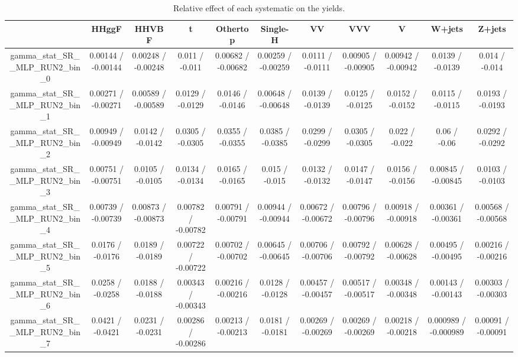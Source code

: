 \documentclass[10pt]{article}
\begin{document}
\begin{table}[htbp]
\begin{center}
\begin{tabular}{|c|c|c|c|c|c|c|c|c|c|c|}
\hline 
      & HHggF      & HHVBF      & t      & Othertop      & Single-H      & VV      & VVV      & V      & W+jets      & Z+jets \\ 
\hline 
  gamma_stat_SR__MLP_RUN2_bin_0 & 0.00144 / -0.00144 & 0.00248 / -0.00248 & 0.011 / -0.011 & 0.00682 / -0.00682 & 0.00259 / -0.00259 & 0.0111 / -0.0111 & 0.00905 / -0.00905 & 0.00942 / -0.00942 & 0.0139 / -0.0139 & 0.014 / -0.014 \\ 
  gamma_stat_SR__MLP_RUN2_bin_1 & 0.00271 / -0.00271 & 0.00589 / -0.00589 & 0.0129 / -0.0129 & 0.0146 / -0.0146 & 0.00648 / -0.00648 & 0.0139 / -0.0139 & 0.0125 / -0.0125 & 0.0152 / -0.0152 & 0.0115 / -0.0115 & 0.0193 / -0.0193 \\ 
  gamma_stat_SR__MLP_RUN2_bin_2 & 0.00949 / -0.00949 & 0.0142 / -0.0142 & 0.0305 / -0.0305 & 0.0355 / -0.0355 & 0.0385 / -0.0385 & 0.0299 / -0.0299 & 0.0305 / -0.0305 & 0.022 / -0.022 & 0.06 / -0.06 & 0.0292 / -0.0292 \\ 
  gamma_stat_SR__MLP_RUN2_bin_3 & 0.00751 / -0.00751 & 0.0105 / -0.0105 & 0.0134 / -0.0134 & 0.0165 / -0.0165 & 0.015 / -0.015 & 0.0132 / -0.0132 & 0.0147 / -0.0147 & 0.0156 / -0.0156 & 0.00845 / -0.00845 & 0.0103 / -0.0103 \\ 
  gamma_stat_SR__MLP_RUN2_bin_4 & 0.00739 / -0.00739 & 0.00873 / -0.00873 & 0.00782 / -0.00782 & 0.00791 / -0.00791 & 0.00944 / -0.00944 & 0.00672 / -0.00672 & 0.00796 / -0.00796 & 0.00918 / -0.00918 & 0.00361 / -0.00361 & 0.00568 / -0.00568 \\ 
  gamma_stat_SR__MLP_RUN2_bin_5 & 0.0176 / -0.0176 & 0.0189 / -0.0189 & 0.00722 / -0.00722 & 0.00702 / -0.00702 & 0.00645 / -0.00645 & 0.00706 / -0.00706 & 0.00792 / -0.00792 & 0.00628 / -0.00628 & 0.00495 / -0.00495 & 0.00216 / -0.00216 \\ 
  gamma_stat_SR__MLP_RUN2_bin_6 & 0.0258 / -0.0258 & 0.0188 / -0.0188 & 0.00343 / -0.00343 & 0.00216 / -0.00216 & 0.0128 / -0.0128 & 0.00457 / -0.00457 & 0.00517 / -0.00517 & 0.00348 / -0.00348 & 0.00143 / -0.00143 & 0.00303 / -0.00303 \\ 
  gamma_stat_SR__MLP_RUN2_bin_7 & 0.0421 / -0.0421 & 0.0231 / -0.0231 & 0.00286 / -0.00286 & 0.00213 / -0.00213 & 0.0181 / -0.0181 & 0.00269 / -0.00269 & 0.00269 / -0.00269 & 0.00218 / -0.00218 & 0.000989 / -0.000989 & 0.00091 / -0.00091 \\ 
\hline 
\end{tabular} 
\caption{Relative effect of each systematic on the yields.} 
\end{center} 
\end{table} 
\end{document}
